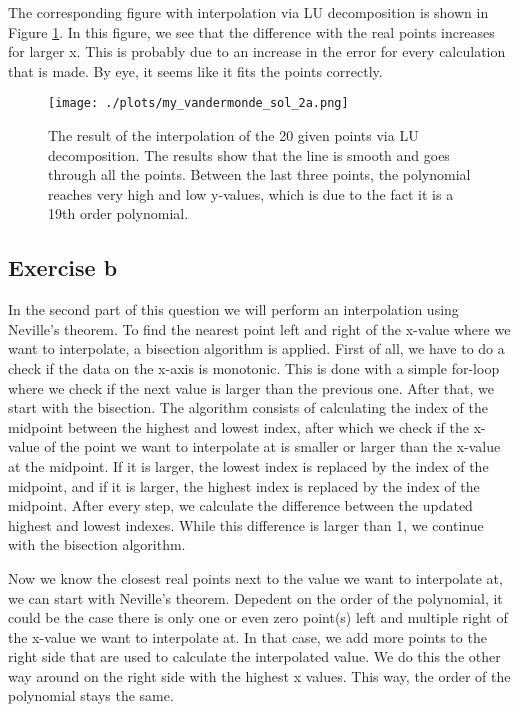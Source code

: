 

The corresponding figure with interpolation via LU decomposition is shown in Figure \ref{fig:2a}. In this figure, we see that the difference with the real points increases for larger x. This is probably due to an increase in the error for every calculation that is made. By eye, it seems like it fits the points correctly. 

\begin{figure}[h!]
  \centering
  \texttt{[image: ./plots/my\_vandermonde\_sol\_2a.png]}
  \caption{The result of the interpolation of the 20 given points via LU decomposition. The results show that the line is smooth and goes through all the points. Between the last three points, the polynomial reaches very high and low y-values, which is due to the fact it is a 19th order polynomial.}
  \label{fig:2a}
\end{figure}

\subsection{Exercise b}
In the second part of this question we will perform an interpolation using Neville's theorem. To find the nearest point left and right of the x-value where we want to interpolate, a bisection algorithm is applied. First of all, we have to do a check if the data on the x-axis is monotonic. This is done with a simple for-loop where we check if the next value is larger than the previous one. After that, we start with the bisection.
The algorithm consists of calculating the index of the midpoint between the highest and lowest index, after which we check if the x-value of the point we want to interpolate at is smaller or larger than the x-value at the midpoint. If it is larger, the lowest index is replaced by the index of the midpoint, and if it is larger, the highest index is replaced by the index of the midpoint. After every step, we calculate the difference between the updated highest and lowest indexes. While this difference is larger than 1, we continue with the bisection algorithm. 

Now we know the closest real points next to the value we want to interpolate at, we can start with Neville's theorem. Depedent on the order of the polynomial, it could be the case there is only one or even zero point(s) left and multiple right of the x-value we want to interpolate at. In that case, we add more points to the right side that are used to calculate the interpolated value. We do this the other way around on the right side with the highest x values. This way, the order of the polynomial stays the same.

